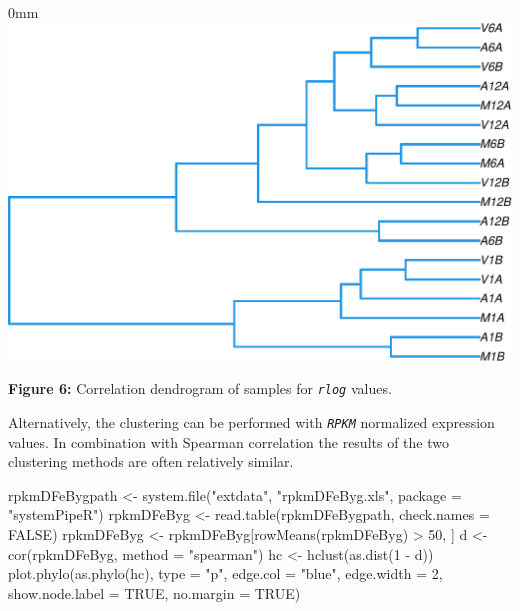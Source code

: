 \documentclass[14pt,]{article}
\newcommand{\hlnum}[1]{\textcolor[rgb]{0.816,0.125,0.439}{#1}}%
\newcommand{\hlstr}[1]{\textcolor[rgb]{0.251,0.627,0.251}{#1}}%
\newcommand{\hlopt}[1]{\textcolor[rgb]{0,0,0}{#1}}%
\newcommand{\hlstd}[1]{\textcolor[rgb]{0.251,0.251,0.251}{#1}}%
\newcommand{\hlkwc}[1]{\textcolor[rgb]{0.251,0.251,0.251}{#1}}%
\newcommand{\hlkwd}[1]{\textcolor[rgb]{0.878,0.439,0.125}{#1}}%
\newenvironment{Shaded}{\begin{myshaded}}{\end{myshaded}}
\newcommand{\KeywordTok}[1]{\hlkwd{#1}}
\newcommand{\DataTypeTok}[1]{\hlkwc{#1}}
\newcommand{\DecValTok}[1]{\hlnum{#1}}
\newcommand{\StringTok}[1]{\hlstr{#1}}
\newcommand{\OtherTok}[1]{{#1}}
\newcommand{\OperatorTok}[1]{\hlopt{#1}}
\newcommand{\NormalTok}[1]{\hlstd{#1}}
\begin{document}
\begin{adjustwidth}{\fltoffset}{0mm}
\includegraphics{systemPipeR_files/figure-latex/sample_tree_rlog-1} \end{adjustwidth}

\textbf{Figure 6:} Correlation dendrogram of samples for \emph{\texttt{rlog}} values.

Alternatively, the clustering can be performed with \emph{\texttt{RPKM}} normalized expression values. In combination with Spearman correlation the results of the two clustering methods are often relatively similar.

\begin{Shaded}
\begin{Highlighting}[]
\NormalTok{rpkmDFeBygpath <-}\StringTok{ }\KeywordTok{system.file}\NormalTok{(}\StringTok{"extdata"}\NormalTok{, }\StringTok{"rpkmDFeByg.xls"}\NormalTok{, }\DataTypeTok{package =} \StringTok{"systemPipeR"}\NormalTok{)}
\NormalTok{rpkmDFeByg <-}\StringTok{ }\KeywordTok{read.table}\NormalTok{(rpkmDFeBygpath, }\DataTypeTok{check.names =} \OtherTok{FALSE}\NormalTok{)}
\NormalTok{rpkmDFeByg <-}\StringTok{ }\NormalTok{rpkmDFeByg[}\KeywordTok{rowMeans}\NormalTok{(rpkmDFeByg) }\OperatorTok{>}\StringTok{ }\DecValTok{50}\NormalTok{, ]}
\NormalTok{d <-}\StringTok{ }\KeywordTok{cor}\NormalTok{(rpkmDFeByg, }\DataTypeTok{method =} \StringTok{"spearman"}\NormalTok{)}
\NormalTok{hc <-}\StringTok{ }\KeywordTok{hclust}\NormalTok{(}\KeywordTok{as.dist}\NormalTok{(}\DecValTok{1} \OperatorTok{-}\StringTok{ }\NormalTok{d))}
\KeywordTok{plot.phylo}\NormalTok{(}\KeywordTok{as.phylo}\NormalTok{(hc), }\DataTypeTok{type =} \StringTok{"p"}\NormalTok{, }\DataTypeTok{edge.col =} \StringTok{"blue"}\NormalTok{, }\DataTypeTok{edge.width =} \DecValTok{2}\NormalTok{, }\DataTypeTok{show.node.label =} \OtherTok{TRUE}\NormalTok{, }
    \DataTypeTok{no.margin =} \OtherTok{TRUE}\NormalTok{)}
\end{Highlighting}
\end{Shaded}
\end{document}
